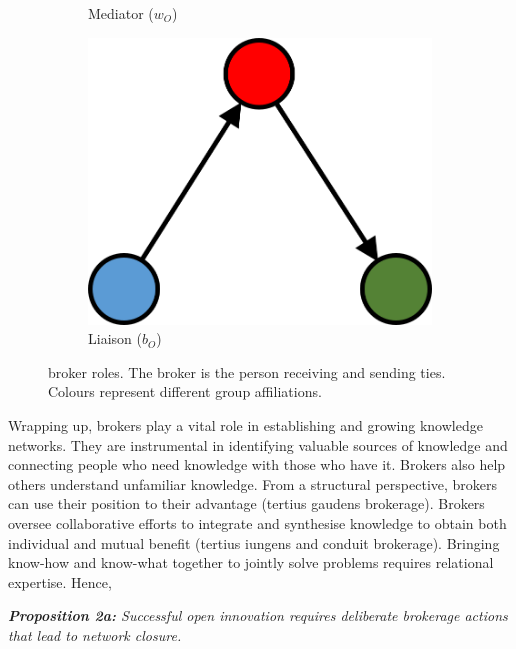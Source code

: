 \begin{figure}
\begin{subfigure}[b]{0.25\textwidth}
    \caption{Mediator ($w_O$)}
    \label{fig:4}
  \end{subfigure}
  \hspace{2em}
  \begin{subfigure}[b]{0.25\textwidth}
    \includegraphics[width=\textwidth]{Images/b_O.png}
    \caption{Liaison ($b_O$)}
    \label{fig:5}
  \end{subfigure}
  \caption[\citet{gould1989structures} broker roles]{\citet{gould1989structures} broker roles. The broker is the person receiving and sending ties. Colours represent different group affiliations.}%
    \label{fig:gf_roles}%
\end{figure}

Wrapping up, brokers play a vital role in establishing and growing knowledge networks. They are instrumental in identifying valuable sources of knowledge and connecting people who need knowledge with those who have it. Brokers also help others understand unfamiliar knowledge. From a structural perspective, brokers can use their position to their advantage (tertius gaudens brokerage). Brokers oversee collaborative efforts to integrate and synthesise knowledge to obtain both individual and mutual benefit (tertius iungens and conduit brokerage). Bringing know-how and know-what together to jointly solve problems requires relational expertise. Hence, \bigskip  

\begin{tcolorbox}
\textit{\textbf{Proposition 2a:} Successful open innovation requires deliberate brokerage actions that lead to network closure.}
\end{tcolorbox}

